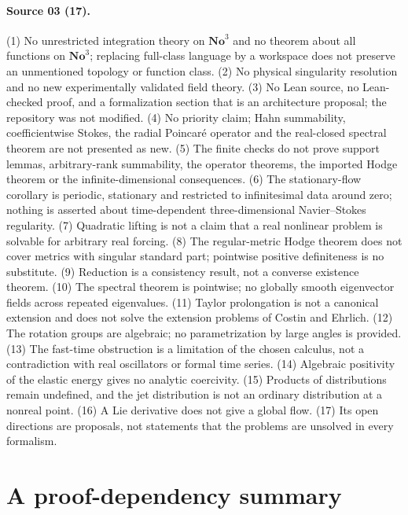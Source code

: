 \documentclass[11pt,letterpaper]{article}
\theoremstyle{definition}
\theoremstyle{remark}
\newcommand{\No}{\mathbf{No}}
\begin{document}
\paragraph{Source 03 (17).}
(1) No unrestricted integration theory on $\No^3$ and no theorem about all
functions on $\No^3$; replacing full-class language by a workspace does not
preserve an unmentioned topology or function class. (2) No physical singularity
resolution and no new experimentally validated field theory. (3) No Lean source,
no Lean-checked proof, and a formalization section that is an architecture
proposal; the repository was not modified. (4) No priority claim; Hahn
summability, coefficientwise Stokes, the radial Poincar\'e operator and the
real-closed spectral theorem are not presented as new. (5) The finite checks do
not prove support lemmas, arbitrary-rank summability, the operator theorems, the
imported Hodge theorem or the infinite-dimensional consequences. (6) The
stationary-flow corollary is periodic, stationary and restricted to infinitesimal
data around zero; nothing is asserted about time-dependent three-dimensional
Navier--Stokes regularity. (7) Quadratic lifting is not a claim that a real
nonlinear problem is solvable for arbitrary real forcing. (8) The regular-metric
Hodge theorem does not cover metrics with singular standard part; pointwise
positive definiteness is no substitute. (9) Reduction is a consistency result,
not a converse existence theorem. (10) The spectral theorem is pointwise; no
globally smooth eigenvector fields across repeated eigenvalues. (11) Taylor
prolongation is not a canonical extension and does not solve the extension
problems of Costin and Ehrlich. (12) The rotation groups are algebraic; no
parametrization by large angles is provided. (13) The fast-time obstruction is a
limitation of the chosen calculus, not a contradiction with real oscillators or
formal time series. (14) Algebraic positivity of the elastic energy gives no
analytic coercivity. (15) Products of distributions remain undefined, and the jet
distribution is not an ordinary distribution at a nonreal point. (16) A Lie
derivative does not give a global flow. (17) Its open directions are proposals,
not statements that the problems are unsolved in every formalism.

\section{A proof-dependency summary}\label{vtf:app:dependency}
\end{document}
